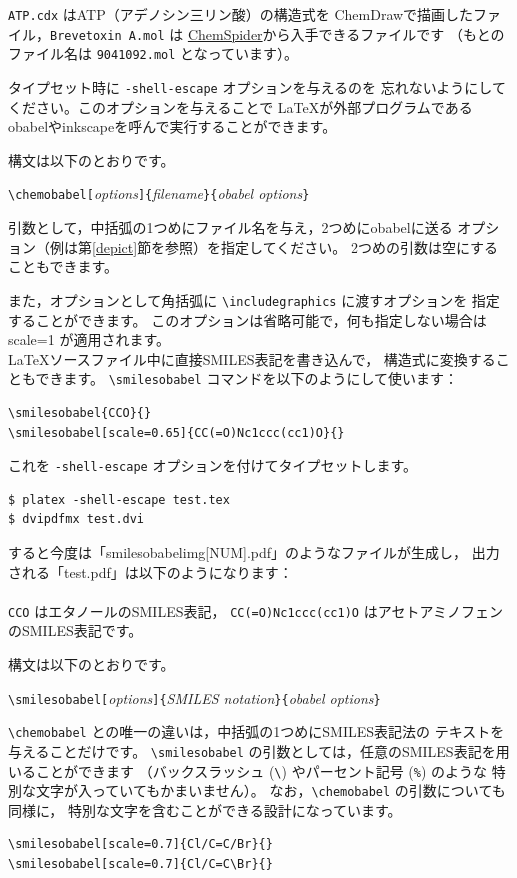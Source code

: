\documentclass[dvipdfmx,12pt]{jsarticle}
\begin{document}
\verb|ATP.cdx| はATP（アデノシン三リン酸）の構造式を
ChemDrawで描画したファイル，\verb|Brevetoxin A.mol| は
\href{http://www.chemspider.com/}{ChemSpider}から入手できるファイルです
（もとのファイル名は \verb|9041092.mol| となっています）。

タイプセット時に \verb|-shell-escape| オプションを与えるのを
忘れないようにしてください。このオプションを与えることで
\LaTeX が外部プログラムであるobabelやinkscapeを呼んで実行することができます。

構文は以下のとおりです。
\begin{center}
\verb|\chemobabel[|\textit{options}\verb|]{|\textit{filename}\verb|}{|\textit{obabel options}\verb|}|
\end{center}
引数として，中括弧の1つめにファイル名を与え，2つめにobabelに送る
オプション（例は第\ref{depict}節を参照）を指定してください。
2つめの引数は空にすることもできます。

また，オプションとして角括弧に \verb|\includegraphics| に渡すオプションを
指定することができます。
このオプションは省略可能で，何も指定しない場合は scale=1 が適用されます。 \\

\LaTeX ソースファイル中に直接SMILES表記を書き込んで，
構造式に変換することもできます。
\verb|\smilesobabel| コマンドを以下のようにして使います：
\begin{verbatim}
\smilesobabel{CCO}{}
\smilesobabel[scale=0.65]{CC(=O)Nc1ccc(cc1)O}{}
\end{verbatim}
これを \verb|-shell-escape| オプションを付けてタイプセットします。
\begin{verbatim}
$ platex -shell-escape test.tex
$ dvipdfmx test.dvi
\end{verbatim}
すると今度は「smilesobabelimg[NUM].pdf」のようなファイルが生成し，
出力される「test.pdf」は以下のようになります： \\
 \\
\verb|CCO| はエタノールのSMILES表記，
\verb|CC(=O)Nc1ccc(cc1)O| はアセトアミノフェンのSMILES表記です。

構文は以下のとおりです。
\begin{center}
\verb|\smilesobabel[|\textit{options}\verb|]{|\textit{SMILES notation}\verb|}{|\textit{obabel options}\verb|}|
\end{center}
\verb|\chemobabel| との唯一の違いは，中括弧の1つめにSMILES表記法の
テキストを与えることだけです。
\verb|\smilesobabel| の引数としては，任意のSMILES表記を用いることができます
（バックスラッシュ (\verb|\|) やパーセント記号 (\verb|%|) のような
特別な文字が入っていてもかまいません）。
なお，\verb|\chemobabel| の引数についても同様に，
特別な文字を含むことができる設計になっています。
\begin{verbatim}
\smilesobabel[scale=0.7]{Cl/C=C/Br}{}
\smilesobabel[scale=0.7]{Cl/C=C\Br}{}
\end{verbatim}
\end{document}
